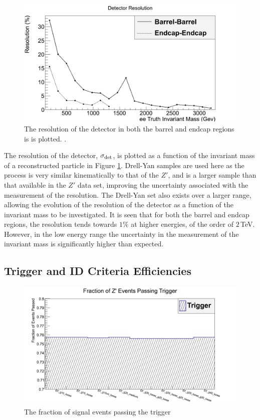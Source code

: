 \documentclass{article}
\begin{document}
\begin{figure}[h]
    \centering \includegraphics[scale=0.3]{images/resolution.png} \caption{ The resolution of the detector in both the barrel and endcap regions is  is plotted.  \label{fig:Resolution}.}
\end{figure}

The resolution of the detector, $\sigma_{\rm{det}}$, is plotted as a function of the invariant mass of a reconstructed particle in Figure \ref{fig:Resolution}. Drell-Yan samples are used here as the process is very similar kinematically to that of the $Z'$, and is a larger sample than that available in the $Z'$ data set, improving the uncertainty associated with the measurement of the resolution. The Drell-Yan set also exists over a larger range, allowing the evolution of the resolution of the detector as a function of the invariant mass to be investigated. It is seen that for both the barrel and endcap regions, the resolution tends towards $1\%$ at higher energies, of the order of $2\,$TeV. However, in the low energy range the uncertainty in the measurement of the invariant mass is significantly higher than expected.

\subsection{Trigger and ID Criteria Efficiencies}
\begin{figure}[h]
    \centering \includegraphics[scale=0.3]{images/TriggerZ.png} \caption{ The fraction of signal events passing the trigger \label{fig:TriggerZ} }
\end{figure}
\end{document}
